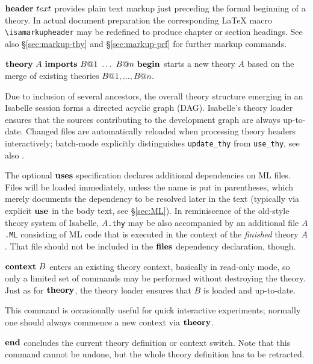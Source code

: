 \begin{descr}
\item [${\mathord{\mathbf{header}}}~text$] provides plain text markup just preceding
  the formal beginning of a theory.  In actual document preparation the
  corresponding {\LaTeX} macro \verb,\isamarkupheader, may be redefined to
  produce chapter or section headings.  See also \S\ref{sec:markup-thy} and
  \S\ref{sec:markup-prf} for further markup commands.
  
\item [${\mathord{\mathbf{theory}}}~A~{\mathord{\mathbf{imports}}}~B@1~\ldots~B@n~{\mathord{\mathbf{begin}}}$]
  starts a new theory $A$ based on the merge of existing theories $B@1, \dots,
  B@n$.
  
  Due to inclusion of several ancestors, the overall theory structure emerging
  in an Isabelle session forms a directed acyclic graph (DAG).  Isabelle's
  theory loader ensures that the sources contributing to the development graph
  are always up-to-date.  Changed files are automatically reloaded when
  processing theory headers interactively; batch-mode explicitly distinguishes
  \verb,update_thy, from \verb,use_thy,, see also \cite{isabelle-ref}.
  
  The optional ${\mathord{\mathbf{uses}}}$ specification declares additional
  dependencies on ML files.  Files will be loaded immediately, unless the name
  is put in parentheses, which merely documents the dependency to be resolved
  later in the text (typically via explicit ${\mathord{\mathbf{use}}}$ in the body text,
  see \S\ref{sec:ML}).  In reminiscence of the old-style theory system of
  Isabelle, \texttt{$A$.thy} may be also accompanied by an additional file
  \texttt{$A$.ML} consisting of ML code that is executed in the context of the
  \emph{finished} theory $A$.  That file should not be included in the
  ${\mathord{\mathbf{files}}}$ dependency declaration, though.
  
\item [${\mathord{\mathbf{context}}}~B$] enters an existing theory context, basically in read-only
  mode, so only a limited set of commands may be performed without destroying
  the theory.  Just as for ${\mathord{\mathbf{theory}}}$, the theory loader ensures that $B$ is
  loaded and up-to-date.
  
  This command is occasionally useful for quick interactive experiments;
  normally one should always commence a new context via ${\mathord{\mathbf{theory}}}$.
  
\item [${\mathord{\mathbf{end}}}$] concludes the current theory definition or context switch.
  Note that this command cannot be undone, but the whole theory definition has
  to be retracted.

\end{descr}


